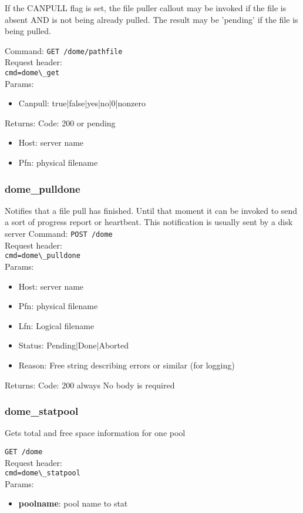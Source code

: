 \documentclass[a4paper,10pt]{scrreprt}
\begin{document}
If the CANPULL flag is set, the file puller callout may be invoked if the file is absent AND is not being already pulled.
The result may be 'pending' if the file is being pulled.

Command:
\lstinline"GET /dome/pathfile"\\
Request header:\\
\lstinline"cmd=dome\_get"\\
Params:
\begin{itemize}
 \item Canpull: true|false|yes|no|0|nonzero
\end{itemize}

Returns:
Code: 200 or pending
\begin{itemize}
 \item Host: server name
 \item Pfn: physical filename
\end{itemize}

\subsubsection{dome\_pulldone}
Notifies that a file pull has finished. Until that moment it can be invoked to send a sort of progress report or heartbeat.
This notification is usually sent by a disk server
Command:
\lstinline"POST /dome"\\
Request header:\\
\lstinline"cmd=dome\_pulldone"\\
Params:
\begin{itemize}
 \item Host: server name
 \item Pfn: physical filename
 \item Lfn: Logical filename
 \item Status: Pending|Done|Aborted
 \item Reason: Free string describing errors or similar (for logging)
\end{itemize}

Returns:
Code: 200 always
No body is required

\subsubsection{dome\_statpool}
Gets total and free space information for one pool

\lstinline"GET /dome"\\
Request header:\\
\lstinline"cmd=dome\_statpool"\\
Params:
\begin{itemize}
 \item \textbf{poolname}: pool name to stat
\end{itemize}
\end{document}

